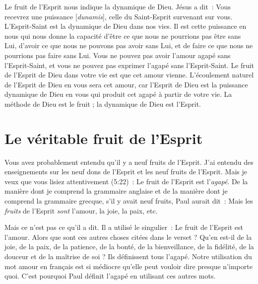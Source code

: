 \og Le fruit de l'Esprit \fg{} nous indique la dynamique de Dieu.
 Jésus a dit~: \og Vous recevrez une puissance [\emph{dunamis}],
 celle du Saint-Esprit survenant sur vous. \fg{}
 L'Esprit-Saint est la dynamique de Dieu dans nos vies.
 Il est cette puissance en nous qui nous donne la capacité
 d'être ce que nous ne pourrions pas être sans Lui,
 d'avoir ce que nous ne pouvons pas avoir sans Lui,
 et de faire ce que nous ne pourrions pas faire sans Lui.
 Vous ne pouvez pas avoir l'amour agapé sans l'Esprit-Saint,
 et vous ne pouvez pas exprimer l'agapé sans l'Esprit-Saint.
 Le fruit de l'Esprit de Dieu dans votre vie est que cet amour vienne.
 L'écoulement naturel de l'Esprit de Dieu en vous sera cet amour,
 car l'Esprit de Dieu est la puissance dynamique de Dieu
 en vous qui produit cet agapé à partir de votre vie.
 La méthode de Dieu est le fruit ; la dynamique de Dieu est l'Esprit.


\section{Le v\'eritable fruit de l'Esprit}

Vous avez probablement entendu qu'il y a neuf fruits de l'Esprit.
 J'ai entendu des enseignements sur les neuf dons de l'Esprit
 et les neuf fruits de l'Esprit. Mais je veux que vous lisiez
 attentivement (5:22)~:
 \og Le fruit de l'Esprit est l'\emph{agapé}. \fg{}
 De la manière dont je comprend la grammaire anglaise
 et de la manière dont je comprend la grammaire grecque,
 s'il y avait neuf fruits, Paul aurait dit~:
 \og Mais les \emph{fruits} de l'Esprit \emph{sont} l'amour,
 la joie, la paix, etc. \fg{}
 \nowidow

Mais ce n'est pas ce qu'il a dit. Il a utilisé le singulier~:
 \og Le fruit de l'Esprit est l'amour. \fg{}
 Alors que sont ces autres choses citées dans le verset ?
 Qu'en est-il de la joie, de la paix, de la patience, de la bonté,
 de la bienveillance, de la fidélité, de la douceur
 et de la maîtrise de soi ? Ils définissent tous l'agapé.
 Notre utilisation du mot \og amour \fg{} en français est si médiocre
 qu'elle peut vouloir dire presque n'importe quoi.
 C'est pourquoi Paul définit l'agapé en utilisant ces autres mots.

